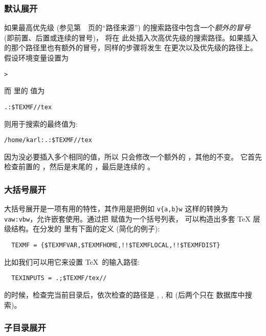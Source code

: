 \documentclass{article}
\begin{document}
\subsubsection{默认展开}
\label{sec:default-expansion}

如果最高优先级 (参见第~\pageref{sec:path-sources}~页的``路径来源'')
的搜索路径中包含一个\emph{额外的冒号} (即前置、后置或连续的冒号)，\KPS{} 将在
此处插入次高优先级的搜索路径。如果插入的那个路径里也有额外的冒号，同样的步骤将发生
在更次以及优先级的路径上。假设环境变量设置为

\begin{alltt}
> 
\end{alltt}
而  里的  值为

\begin{alltt}
  .:\$TEXMF//tex
\end{alltt}
则用于搜索的最终值为: 

\begin{alltt}
  /home/karl:.:\$TEXMF//tex
\end{alltt}

因为没必要插入多个相同的值，所以 \KPS{} 只会修改一个额外的 \samp{:}，其他的不变。
它首先检查前置的 \samp{:}，然后是末尾的 \samp{:}，最后是连续的 \samp{:}。

\subsubsection{大括号展开}
\label{sec:brace-expansion}

大括号展开是一项有用的特性，其作用是把例如 \verb+v{a,b}w+ 这样的转换为
\verb+vaw:vbw+，允许嵌套使用。通过把  赋值为一个括号列表，
可以构造出多套 \TeX{} 层级结构。在分发的  里有下面的定义
(简化的例子): 
\begin{verbatim}
  TEXMF = {$TEXMFVAR,$TEXMFHOME,!!$TEXMFLOCAL,!!$TEXMFDIST}
\end{verbatim}
比如我们可以用它来设置 \TeX\ 的输入路径: 
\begin{verbatim}
  TEXINPUTS = .;$TEXMF/tex//
\end{verbatim}
的时候，检查完当前目录后，依次检查的路径是
, , 
和  (后两个只在  数据库中搜索)。

\subsubsection{子目录展开}
\label{sec:subdirectory-expansion}
\end{document}
